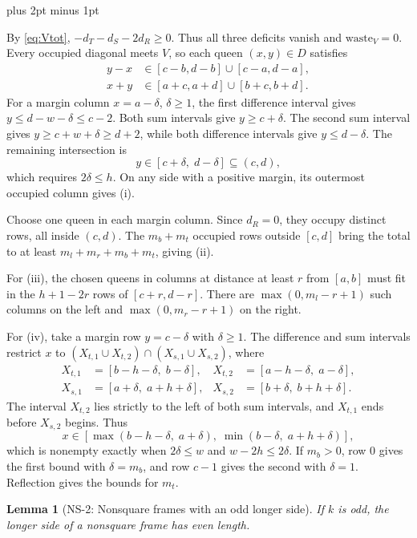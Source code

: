 \documentclass[11pt,a4paper]{article}
\makeatletter
\renewenvironment{proof}[1][\proofname]{%
  \par\pushQED{\qed}\normalfont
  \topsep8pt plus 2pt minus 1pt\relax
  \trivlist\item[\hskip\labelsep\itshape #1\@addpunct{.}]\ignorespaces
}{\popQED\endtrivlist\@endpefalse}
\theoremstyle{result}
\newtheorem{lemma}[theorem]{Lemma}
\theoremstyle{definition}
\theoremstyle{remark}
\newcommand{\waste}{\mathrm{waste}}
\makeatother
\begin{document}
\begin{proof}
By \eqref{eq:Vtot}, $-d_T-d_S-2d_R\ge0$. Thus all three
deficits vanish and $\waste_V=0$. Every occupied diagonal meets
$V$, so each queen $(x,y)\in D$ satisfies
\[
  \begin{aligned}
    y-x &\in [c-b,d-b]\cup[c-a,d-a],\\
    x+y &\in [a+c,a+d]\cup[b+c,b+d].
  \end{aligned}
\]
For a margin column $x=a-\delta$, $\delta\ge1$, the first difference
interval gives $y\le d-w-\delta\le c-2$. Both sum intervals give
$y\ge c+\delta$. The second sum interval gives $y\ge c+w+\delta\ge d+2$,
while both difference intervals give $y\le d-\delta$.
The remaining intersection is
\[
  y \in [c + \delta,\; d - \delta] \subseteq (c, d),
\]
which requires $2\delta\le h$. On any side with a positive
margin, its outermost occupied column gives (i).

Choose one queen in each margin column. Since $d_R=0$, they
occupy distinct rows, all inside $(c,d)$. The $m_b+m_t$ occupied
rows outside $[c,d]$ bring the total to at least
$m_l+m_r+m_b+m_t$, giving (ii).

For (iii), the chosen queens in columns at distance at least $r$
from $[a,b]$ must fit in the $h+1-2r$ rows of $[c+r,d-r]$.
There are $\max(0,m_l-r+1)$ such columns on the left and
$\max(0,m_r-r+1)$ on the right.

For (iv), take a margin row $y=c-\delta$ with $\delta\ge1$.
The difference and sum intervals restrict $x$ to
$(X_{t,1}\cup X_{t,2})\cap(X_{s,1}\cup X_{s,2})$, where
\begin{align*}
  X_{t,1} &= [b - h - \delta,\; b - \delta], & X_{t,2} &= [a - h - \delta,\; a - \delta], \\
  X_{s,1} &= [a + \delta,\; a + h + \delta], & X_{s,2} &= [b + \delta,\; b + h + \delta].
\end{align*}
The interval $X_{t,2}$ lies strictly to the left of both sum
intervals, and $X_{t,1}$ ends before $X_{s,2}$ begins. Thus
\[
  x \in [\max(b - h - \delta,\; a + \delta),\; \min(b - \delta,\; a + h + \delta)],
\]
which is nonempty exactly when $2\delta\le w$ and $w-2h\le2\delta$.
If $m_b>0$, row $0$ gives the first bound with $\delta=m_b$,
and row $c-1$ gives the second with $\delta=1$. Reflection gives
the bounds for $m_t$.
\end{proof}

\begin{lemma}[NS-2: Nonsquare frames with an odd longer side]\label{lem:ns2}
If $k$ is odd, the longer side of a nonsquare frame has even length.
\end{lemma}
\end{document}
